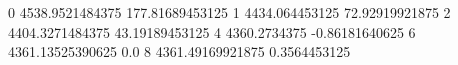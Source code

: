0 4538.9521484375 177.81689453125
1 4434.064453125 72.92919921875
2 4404.3271484375 43.19189453125
4 4360.2734375 -0.86181640625
6 4361.13525390625 0.0
8 4361.49169921875 0.3564453125
